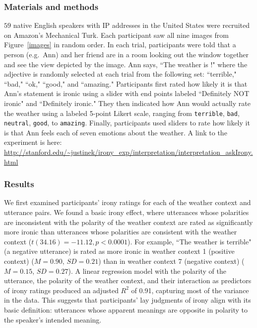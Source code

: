 \documentclass[10pt,letterpaper]{article}
\begin{document}
\subsubsection{Materials and methods}
$59$ native English speakers with IP addresses in the United States were recruited on Amazon's Mechanical Turk. Each participant saw all nine images from Figure~\ref{images} in random order. In each trial, participants were told that a person (e.g.~Ann) and her friend are in a room looking out the window together and see the view depicted by the image. Ann says, ``The weather is \underline{\hspace{1cm}}!" where the adjective is randomly selected at each trial from the following set: ``terrible," ``bad," ``ok," ``good," and ``amazing." Participants first rated how likely it is that Ann's statement is ironic using a slider with end points labeled ``Definitely NOT ironic" and ``Definitely ironic." They then indicated how Ann would actually rate the weather using a labeled 5-point Likert scale, ranging from \texttt{terrible}, \texttt{bad}, \texttt{neutral}, \texttt{good}, to \texttt{amazing}. Finally, participants used sliders to rate how likely it is that Ann feels each of seven emotions about the weather. A link to the experiment is here: \url{http://stanford.edu/~justinek/irony_exp/interpretation/interpretation_askIrony.html}

\subsubsection{Results}
We first examined participants' irony ratings for each of the weather context and utterance pairs. We found a basic irony effect, where utterances whose polarities are inconsistent with the polarity of the weather context are rated as significantly more ironic than utterances whose polarities are consistent with the weather context ($t(34.16)= -11.12, p < 0.0001$). For example, ``The weather is terrible" (a negative utterance) is rated as more ironic in weather context 1 (positive context) ($M = 0.90$, $SD = 0.21$) than in weather context 7 (negative context) ($M =0.15$,	$SD = 0.27$). A linear regression model with the polarity of the utterance, the polarity of the weather context, and their interaction as predictors of irony ratings produced an adjusted $R^{2}$ of 0.91, capturing most of the variance in the data. This suggests that participants' lay judgments of irony align with its basic definition: utterances whose apparent meanings are opposite in polarity to the speaker's intended meaning.
\end{document}
